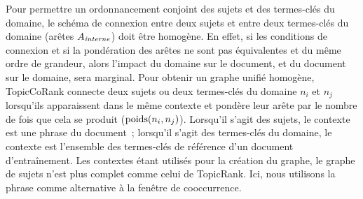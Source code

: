         Pour permettre un ordonnancement conjoint des sujets et des termes-clés
        du domaine, le schéma de connexion entre deux sujets et entre deux
        termes-clés du domaine (arêtes $A_\textnormal{\textit{interne}}$) doit
        être homogène. En effet, si les conditions de connexion et si la
        pondération des arêtes ne sont pas équivalentes et du
        même ordre de grandeur, alors l'impact du domaine sur
        le document, et du document sur le domaine, sera marginal. Pour
        obtenir un graphe unifié homogène, TopicCoRank connecte deux sujets ou
        deux termes-clés du domaine $n_i$ et $n_j$ lorsqu'ils apparaissent
        dans le même contexte et pondère leur arête par le nombre de fois que
        cela se produit ($\textnormal{poids}(n_i, n_j)$). Lorsqu'il s'agit des sujets, le contexte est
        une phrase du document~; lorsqu'il s'agit des
        termes-clés du domaine, le contexte est l'ensemble des termes-clés de
        référence d'un document d'entraînement. Les contextes
        étant utilisés pour la création du graphe, le graphe de sujets n'est
        plus complet comme celui de TopicRank. Ici, nous utilisons la phrase comme
        alternative à la fenêtre de cooccurrence.

